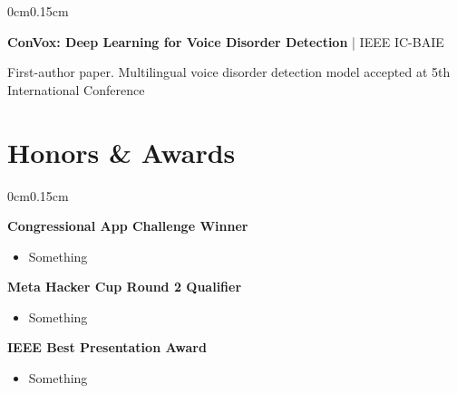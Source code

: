 \documentclass[10pt, letterpaper]{article}
\newenvironment{highlights}{
    \begin{itemize}[topsep=0pt, parsep=0pt, partopsep=0pt, itemsep=0pt, leftmargin=0.4cm]
}{
    \end{itemize}
}
\newenvironment{onecolentry}{
    \begin{adjustwidth}{0cm}{0.15cm}
}{
    \end{adjustwidth}
}
\begin{document}
    \vspace{0.1cm}

    \begin{onecolentry}
        \textbf{ConVox: Deep Learning for Voice Disorder Detection} | IEEE IC-BAIE
        
        \vspace{0.05cm}
        First-author paper. Multilingual voice disorder detection model accepted at 5th International Conference
    \end{onecolentry}

    \vspace{0.05cm}
    \section{Honors \& Awards}
    \vspace{0.05cm}

    \begin{onecolentry}
        \textbf{Congressional App Challenge Winner}
        \begin{highlights}
            \item Something
        \end{highlights}
        \vspace{0.1cm}
        \textbf{Meta Hacker Cup Round 2 Qualifier}
        \begin{highlights}
            \item Something
        \end{highlights}
        \vspace{0.1cm}
        \textbf{IEEE Best Presentation Award}
        \begin{highlights}
            \item Something
        \end{highlights}
    \end{onecolentry}
\end{document}
